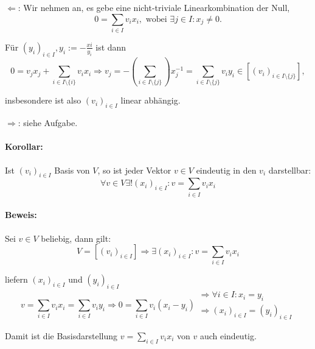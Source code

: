 	$\Leftarrow$: Wir nehmen an, es gebe eine nicht-triviale Linearkombination der Null,
	\begin{equation*}
		0 = \sum_{i\in I} v_ix_i, \text{ wobei } \exists j\in I: x_j \neq 0.
	\end{equation*}

	Für $(y_i)_{i\in I}, y_i := - \frac{xi}{y_i}$ ist dann
	\begin{equation*}
		0 = v_jx_j + \sum_{i\in I\setminus\{i\}} v_ix_i \Rightarrow v_j = -(\sum_{i\in I\setminus\{j\}})x_j^{-1} = \sum_{i\in I\setminus\{j\}} v_iy_i \in [(v_i)_{i\in I\setminus\{j\}}],
	\end{equation*}

	insbesondere ist also $(v_i)_{i\in I}$ linear abhängig.

	$\Rightarrow$: siehe Aufgabe.
	
\paragraph{Korollar:}
	Ist $(v_i)_{i\in I}$ Basis von $ V $, so ist jeder Vektor $v\in V$ eindeutig in den $v_i$ darstellbar:
	\begin{equation*}
		\forall v\in V \exists! (x_i)_{i\in I}: v = \sum_{i\in I} v_ix_i
	\end{equation*}

\paragraph{Beweis:}
	Sei $v\in V$ beliebig, dann gilt:
	\begin{equation*}
		V = [(v_i)_{i\in I}] \Rightarrow \exists (x_i)_{i\in I}: v = \sum_{i\in I} v_ix_i
	\end{equation*}

	liefern $(x_i)_{i\in I}$ und $(y_i)_{i\in I}$
	\begin{equation*}
		v = \sum_{i\in I} v_ix_i = \sum_{i\in I}v_iy_i \Rightarrow 0 = \sum_{i\in I} v_i(x_i-y_i)
		\begin{array}{l}
			\Rightarrow \forall i\in I: x_i = y_i\\
			\Rightarrow (x_i)_{i\in I} = (y_i)_{i\in I}
		\end{array}
	\end{equation*}

	Damit ist die Basisdarstellung $v = \sum_{i\in I} v_ix_i$ von $ v $ auch eindeutig.

